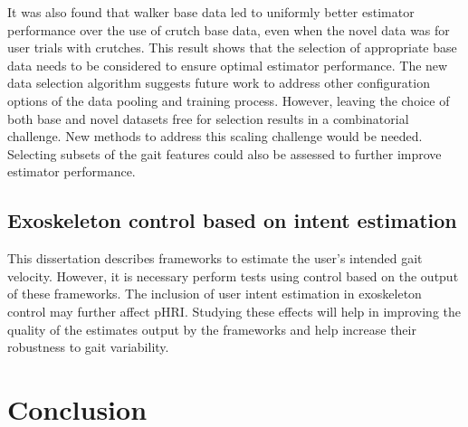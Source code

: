 It was also found that walker base data led to uniformly better estimator performance over the use of crutch base data, even when the novel data was for user trials with crutches. This result shows that the selection of appropriate base data needs to be considered to ensure optimal estimator performance. The new data selection algorithm suggests future work to address other configuration options of the data pooling and training process. However, leaving the choice of both base and novel datasets free for selection results in a combinatorial challenge. New methods to address this scaling challenge would be needed. Selecting subsets of the gait features could also be assessed to further improve estimator performance.

\subsection{Exoskeleton control based on intent estimation}

This dissertation describes frameworks to estimate the user's intended gait velocity. However, it is necessary perform tests using control based on the output of these frameworks. The inclusion of user intent estimation in exoskeleton control may further affect pHRI. Studying these effects will help in improving the quality of the estimates output by the frameworks and help increase their robustness to gait variability.

\section{Conclusion}
%


